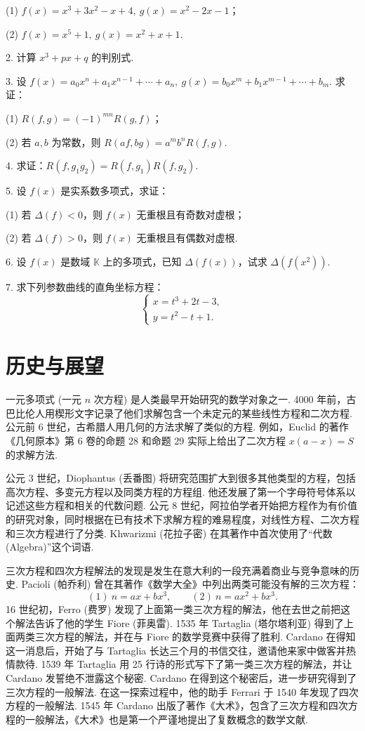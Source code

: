 \documentclass[UTF8,12pt,a4paper,fontset=fandol]{ctexart}
\begin{document}
(1) $f(x)=x^3+3x^2-x+4,\ g(x)=x^2-2x-1$；

(2) $f(x)=x^5+1,\ g(x)=x^2+x+1$.

2. 计算 $x^3+px+q$ 的判别式.

3. 设 $f(x)=a_0x^n+a_1x^{n-1}+\cdots+a_n,\ g(x)=b_0x^m+b_1x^{m-1}+\cdots+b_m$. 求证：

(1) $R(f,g)=(-1)^{mn}R(g,f)$；

(2) 若 $a,b$ 为常数，则 $R(af,bg)=a^mb^nR(f,g)$.

4. 求证：$R(f,g_1g_2)=R(f,g_1)R(f,g_2)$.

5. 设 $f(x)$ 是实系数多项式，求证：

(1) 若 $\Delta(f)<0$，则 $f(x)$ 无重根且有奇数对虚根；

(2) 若 $\Delta(f)>0$，则 $f(x)$ 无重根且有偶数对虚根.

6. 设 $f(x)$ 是数域 $\mathbb{K}$ 上的多项式，已知 $\Delta(f(x))$，试求 $\Delta(f(x^2))$.

7. 求下列参数曲线的直角坐标方程：
\[
\begin{cases}
x=t^3+2t-3,\\
y=t^2-t+1.
\end{cases}
\]

\section*{历史与展望}

一元多项式 (一元 $n$ 次方程) 是人类最早开始研究的数学对象之一. 4000 年前，古巴比伦人用楔形文字记录了他们求解包含一个未定元的某些线性方程和二次方程. 公元前 6 世纪，古希腊人用几何的方法求解了类似的方程. 例如，Euclid 的著作《几何原本》第 6 卷的命题 28 和命题 29 实际上给出了二次方程 $x(a-x)=S$ 的求解方法.

公元 3 世纪，Diophantus (丢番图) 将研究范围扩大到很多其他类型的方程，包括高次方程、多变元方程以及同类方程的方程组. 他还发展了第一个字母符号体系以记述这些方程和相关的代数问题. 公元 8 世纪，阿拉伯学者开始把方程作为有价值的研究对象，同时根据在已有技术下求解方程的难易程度，对线性方程、二次方程和三次方程进行了分类. Khwarizmi (花拉子密) 在其著作中首次使用了“代数 (Algebra)”这个词语.

三次方程和四次方程解法的发现是发生在意大利的一段充满着商业与竞争意味的历史. Pacioli (帕乔利) 曾在其著作《数学大全》中列出两类可能没有解的三次方程：
\[
(1)\ n=ax+bx^3,\qquad (2)\ n=ax^2+bx^3.
\]
16 世纪初，Ferro (费罗) 发现了上面第一类三次方程的解法，他在去世之前把这个解法告诉了他的学生 Fiore (菲奥雷). 1535 年 Tartaglia (塔尔塔利亚) 得到了上面两类三次方程的解法，并在与 Fiore 的数学竞赛中获得了胜利. Cardano 在得知这一消息后，开始了与 Tartaglia 长达三个月的书信交往，邀请他来家中做客并热情款待. 1539 年 Tartaglia 用 25 行诗的形式写下了第一类三次方程的解法，并让 Cardano 发誓绝不泄露这个秘密. Cardano 在得到这个秘密后，进一步研究得到了三次方程的一般解法. 在这一探索过程中，他的助手 Ferrari 于 1540 年发现了四次方程的一般解法. 1545 年 Cardano 出版了著作《大术》，包含了三次方程和四次方程的一般解法，《大术》也是第一个严谨地提出了复数概念的数学文献.
\end{document}
